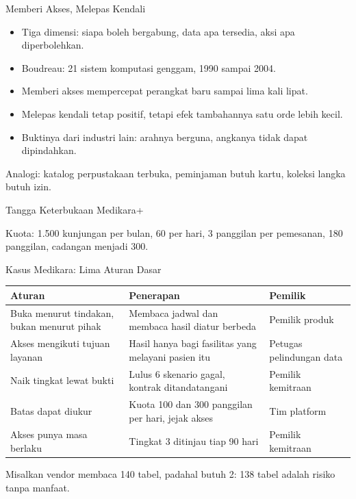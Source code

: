 \documentclass[aspectratio=169, table, 12pt]{beamer}
\begin{document}
\begin{frame}{{\Large Memberi Akses, Melepas Kendali}}
  \vspace{10pt}
  \begin{itemize}
    \item Tiga dimensi: siapa boleh bergabung, data apa tersedia, aksi apa diperbolehkan.
    \item Boudreau: 21 sistem komputasi genggam, 1990 sampai 2004.
    \item Memberi akses mempercepat perangkat baru sampai lima kali lipat.
    \item Melepas kendali tetap positif, tetapi efek tambahannya satu orde lebih kecil.
    \item Buktinya dari industri lain: arahnya berguna, angkanya tidak dapat dipindahkan.
  \end{itemize}
  \vspace{6pt}
  {\small Analogi: katalog perpustakaan terbuka, peminjaman butuh kartu, koleksi langka butuh izin.}
\end{frame}

\begin{frame}{{\Large Tangga Keterbukaan Medikara+}}
  \centering

  \vspace{6pt}
  {\footnotesize Kuota: 1.500 kunjungan per bulan, 60 per hari, 3 panggilan per pemesanan, 180 panggilan, cadangan menjadi 300.}
\end{frame}

\begin{frame}{{\Large Kasus Medikara: Lima Aturan Dasar}}
  \footnotesize
  \begin{tabularx}{\textwidth}{>{\raggedright\arraybackslash}X >{\raggedright\arraybackslash}X
      >{\raggedright\arraybackslash}p{2.9cm}}
    \hline
    \textbf{Aturan} & \textbf{Penerapan} & \textbf{Pemilik} \\ \hline
    Buka menurut tindakan, bukan menurut pihak & Membaca jadwal dan membaca hasil diatur berbeda & Pemilik produk \\ \hline
    Akses mengikuti tujuan layanan & Hasil hanya bagi fasilitas yang melayani pasien itu & Petugas pelindungan data \\ \hline
    Naik tingkat lewat bukti & Lulus 6 skenario gagal, kontrak ditandatangani & Pemilik kemitraan \\ \hline
    Batas dapat diukur & Kuota 100 dan 300 panggilan per hari, jejak akses & Tim platform \\ \hline
    Akses punya masa berlaku & Tingkat 3 ditinjau tiap 90 hari & Pemilik kemitraan \\ \hline
  \end{tabularx}

  \vspace{8pt}
  \small Misalkan vendor membaca 140 tabel, padahal butuh 2: 138 tabel adalah risiko tanpa manfaat.
\end{frame}
\end{document}
